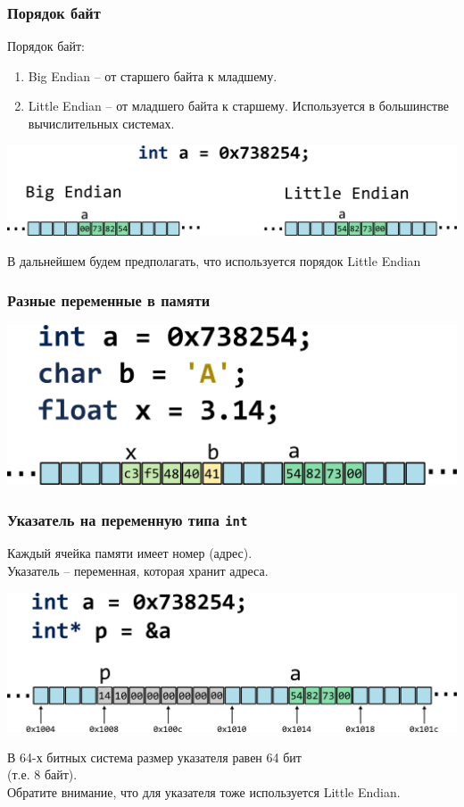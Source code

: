 \documentclass[12pt,pdf,hyperref={unicode}]{beamer}
\begin{document}
\begin{frame}[fragile]
\frametitle{Порядок байт}
Порядок байт:
\begin{enumerate}
\item Big Endian -- от старшего байта к младшему.
\item Little Endian  -- от младшего байта к старшему. Используется в большинстве вычислительных системах.
\end{enumerate}
\begin{center}
\includegraphics[width=1\linewidth]{../images/memory/memory_1_endianness.png}
\end{center}
В дальнейшем будем предполагать, что используется порядок Little Endian
\end{frame}

\begin{frame}[fragile]
\frametitle{Разные переменные в памяти} 
\begin{center}
\includegraphics[width=1\linewidth]{../images/memory/memory_2_different_types.png}
\end{center}
\end{frame}

\begin{frame}[fragile]
\frametitle{Указатель на переменную типа \texttt{int}}
Каждый ячейка памяти имеет номер (адрес).\\
Указатель -- переменная, которая хранит адреса.
\begin{center}
\includegraphics[width=1\linewidth]{../images/memory/memory_3_pointer_to_int.png}
\end{center}
В 64-х битных система размер указателя равен 64 бит \\(т.е. 8 байт).\\
Обратите внимание, что для указателя тоже используется Little Endian.
\end{frame}
\end{document}
